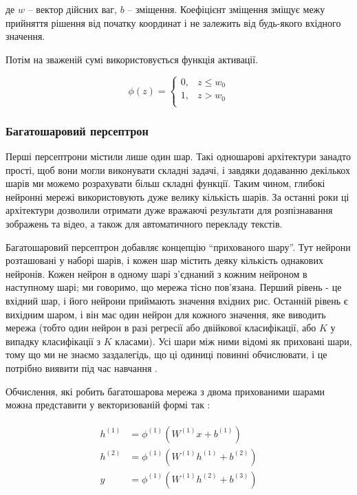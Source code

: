 \documentclass[a4paper,14pt]{extreport}
\begin{document}
де $w$ -- вектор дійсних ваг, $b$ -- зміщення.
Коефіцієнт зміщення зміщує межу прийняття рішення
від початку координат і не залежить від будь-якого
вхідного значення.

Потім на зваженій сумі використовується функція активації.

\begin{equation}
    \phi(z) = \begin{cases}
        0 ,& z \le w_0 \\
        1 ,& z > w_0 \\
    \end{cases}
    \label{eq:perceptron2}
\end{equation}

\subsubsection{Багатошаровий персептрон}
Перші персептрони містили лише один шар. Такі одношарові
архітектури занадто прості, щоб вони могли виконувати складні задачі,
і завдяки додаванню декількох шарів ми можемо розрахувати більш складні
функції. Таким чином, глибокі нейронні мережі використовують дуже
велику кількість шарів. За останні роки ці архітектури дозволили
отримати дуже вражаючі результати для розпізнавання зображень та
відео, а також для автоматичного перекладу текстів.

Багатошаровий персептрон добавляє концепцію
``прихованого шару''. Тут нейрони розташовані у наборі шарів,
і кожен шар містить деяку кількість однакових нейронів.
Кожен нейрон в одному шарі з'єднаний з кожним нейроном в наступному шарі;
ми говоримо, що мережа тісно пов’язана. Перший рівень - це вхідний шар,
і його нейрони приймають значення вхідних рис. 
Останній рівень є вихідним шаром, і він має один нейрон для
кожного значення, яке виводить мережа (тобто один нейрон
в разі регресії або двійкової
класифікації, або $K$  у випадку класифікації з $K$ класами).
Усі шари між ними відомі як приховані шари, тому що ми не знаємо
заздалегідь, що ці одиниці повинні обчислювати, і це потрібно
виявити під час навчання \cite{nn:multilayer-perceptrons}.

Обчислення, які робить багатошарова мережа з двома
прихованими шарами можна
представити у векторизованій формі так \cite{nn:multilayer-perceptrons}:

\begin{gather}
\begin{aligned}
    h^{(1)} &= \phi^{(1)}(W^{(1)}x + b^{(1)}) \\
    h^{(2)} &= \phi^{(1)}(W^{(1)}h^{(1)} + b^{(2)}) \\
    y &= \phi^{(1)}(W^{(1)}h^{(2)} + b^{(3)}) 
\end{aligned}
\end{gather}
\end{document}
